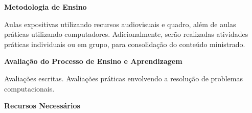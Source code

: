 
 
 
 
 

\begin{snugshade}\begin{center}\textbf{
    Metodologia de Ensino
}\end{center}\end{snugshade}

\noindent
   Aulas expositivas utilizando recursos audiovisuais e quadro, além de aulas práticas utilizando computadores. Adicionalmente, serão realizadas atividades práticas individuais ou em grupo, para consolidação do conteúdo ministrado.

\begin{snugshade}\begin{center}\textbf{
    Avaliação do Processo de Ensino e Aprendizagem
}\end{center}\end{snugshade}

\noindent
   Avaliações escritas. Avalia\c{c}\~oes pr\'aticas envolvendo a resolu\c{c}\~ao de problemas computacionais.
   
\begin{snugshade}\begin{center}\textbf{
    Recursos Necessários
    \vphantom{q} %
}\end{center}\end{snugshade}

